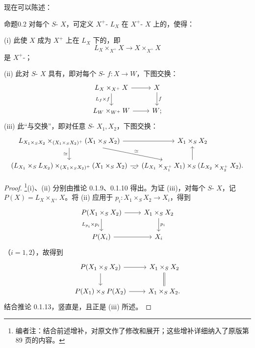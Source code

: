 现在可以陈述：
\begin{SGAresult}{命题}{0.2}
对每个 $S$- $X$，可定义 $X^+$- $L_X$ 在 $X^+$- $X$ 上的，使得：

(i) 此使 $X$ 成为 $X^+$ 上在 $L_X$ 下的，即
\[L_X\times_{X^+}X\longrightarrow X\times_{X^+}X\]
是 $X^+$-；

(ii) 此对 $S$- $X$ 具有，即对每个 $S$- $f:X\to W$，下图交换：
\[\begin{tikzcd}L_X\times_{X^+}X\arrow[r]\arrow[d,"L_f\times f"']&X\arrow[d,"f"]\\L_W\times_{W^+}W\arrow[r]&W;\end{tikzcd}\]
(iii) 此“与交换”，即对任意 $S$- $X_1,X_2$，下图交换：
\[\begin{tikzcd}[column sep=small]
L_{X_1\times_S X_2}\times_{(X_1\times_S X_2)^+}(X_1\times_S X_2)\arrow[r]\arrow[d,"\simeq"']\arrow[dr,"\simeq"]&X_1\times_S X_2\\
(L_{X_1}\times_S L_{X_2})\times_{(X_1\times_S X_2)^+}(X_1\times_S X_2)\arrow[r,"\sim"']&(L_{X_1}\times_{X_1^+}X_1)\times_S(L_{X_2}\times_{X_2^+}X_2)\arrow[u].
\end{tikzcd}\]
\end{SGAresult}
\begin{proof}
\footnote{编者注：结合前述增补，对原文作了修改和展开；这些增补详细纳入了原版第 89 页的内容。}(i)、(ii) 分别由推论 0.1.9、0.1.10 得出。为证 (iii)，对每个 $S$- $X$，记 $P(X)=L_X\times_{X^+}X$。将 (ii) 应用于 $p_i:X_1\times_S X_2\to X_i$，得到
\[\begin{tikzcd}P(X_1\times_S X_2)\arrow[r]\arrow[d,"L_{p_i}\times p_i"']&X_1\times_S X_2\arrow[d,"p_i"]\\P(X_i)\arrow[r]&X_i\end{tikzcd}\]
（$i=1,2$），故得到
\[\begin{tikzcd}P(X_1\times_S X_2)\arrow[r]\arrow[d]&X_1\times_S X_2\arrow[d,equal]\\P(X_1)\times_S P(X_2)\arrow[r]&X_1\times_S X_2.\end{tikzcd}\]
结合推论 0.1.13，竖直是，且正是 (iii) 所述。
\end{proof}
